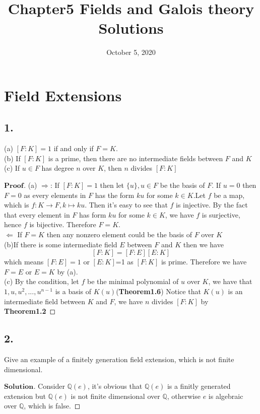 \documentclass[a4paper, 11pt]{article}
\title{Chapter5 Fields and Galois theory Solutions}
\date{October 5, 2020}
\newenvironment{myprf}
{\renewcommand\qedsymbol{$ $}\begin{proof}[$\textbf{Proof}$]}
  {\end{proof}}
\newenvironment{solution}
{\renewcommand\qedsymbol{$ $}\begin{proof}[$\textbf{Solution}$]}
  {\end{proof}}
\begin{document}
       \maketitle

\section*{Field Extensions}
\subsection*{1.}
\noindent
(a) $[F:K]=1$ if and only if $F=K$.\\
(b) If $[F:K]$ is a prime, then there are no intermediate fields between $F$ and $K$\\
(c) If $u\in F$ has degree $n$ over $K$, then $n$ divides $[F:K]$\\
\begin{myprf}
        (a) $\Rightarrow$: If $[F:K]=1$ then let $\{u\},u\in F$ be the basis of $F$. If $u=0$ then $F=0$ as 
        every elements in $F$ has the form $ku$ for some $k\in K$.Let $f$ be a map,
        which is $f:K\rightarrow F, k\mapsto ku$. Then it's easy to see that $f$ is injective.
        By the fact that every element in $F$ has form $ku$ for some $k\in K$, we have
        $f$ is surjective, hence $f$ is bijective. Therefore $F=K$.\\
        \indent
        $\Leftarrow$ If $F=K$ then any nonzero element could be the basis of $F$ over $K$
        \\
        (b)If there is some intermediate field $E$ between $F$ and $K$ then we have
        $$
        [F:K]=[F:E][E:K]
        $$
        which means $[F:E]=1$ or $[E:K]$=1 as $[F:K]$ is prime. Therefore we have $F=E$ 
        or $E=K$ by (a).
        \\
        (c) By the condition, let $f$ be the minimal polynomial of $u$ over $K$, we have
        that $1,u,u^2,...,u^{n-1}$ is a basis of $K(u)$(\textbf{Theorem1.6}) Notice that $K(u)$ is an 
        intermediate field between $K$ and $F$, we have $n$ divides $[F:K]$ by \textbf{Theorem1.2}
\end{myprf}

\subsection*{2.}
\noindent Give an example of a finitely generation field extension, which is not finite 
dimensional.
\begin{solution}
        Consider $\mathbb{Q}(e)$, it's obvious that $\mathbb{Q}(e)$ is a finitly 
        generated extension but $\mathbb{Q}(e)$ is not finite dimensional over 
        $\mathbb{Q}$, otherwise $e$ is algebraic over $\mathbb{Q}$, which is false.
\end{solution}
\end{document}
